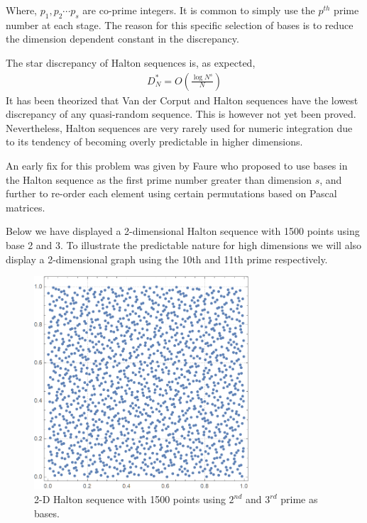 \documentclass[12pt]{article}
\numberwithin{equation}{section}
\begin{document}
Where, $p_1, p_2 \cdots p_s$ are co-prime integers. It is common to simply use the $p^{th}$ prime number at each stage. The reason for this specific selection of bases is to reduce the dimension dependent constant in the discrepancy.
\par The star discrepancy of Halton sequences is, as expected,
\begin{align}
    D_N^*= O \left( \frac{\log N^s}{N}\right)
\end{align}
It has been theorized that Van der Corput and Halton sequences have the lowest discrepancy of any quasi-random sequence. This is however not yet been proved. Nevertheless, Halton sequences are very rarely used for numeric integration  due to its tendency of becoming overly predictable in higher dimensions.
\par An early fix for this problem was given by Faure \cite{faure} who proposed to use bases in the Halton sequence as the first prime number greater than dimension $s$, and further to re-order each element using certain permutations based on Pascal matrices.
\par Below we have displayed a 2-dimensional Halton sequence with 1500 points using base 2 and 3. To illustrate the predictable nature for high dimensions we will also display a 2-dimensional graph using the 10th and 11th prime respectively.
\begin{figure}[!htb]
    \centering
    \includegraphics[width=8cm]{Images/23halton.png}
    \caption{2-D Halton sequence with 1500 points using $2^{nd}$ and $3^{rd}$ prime as bases.}
    \label{fig:example23halton}
\end{figure}
\end{document}
